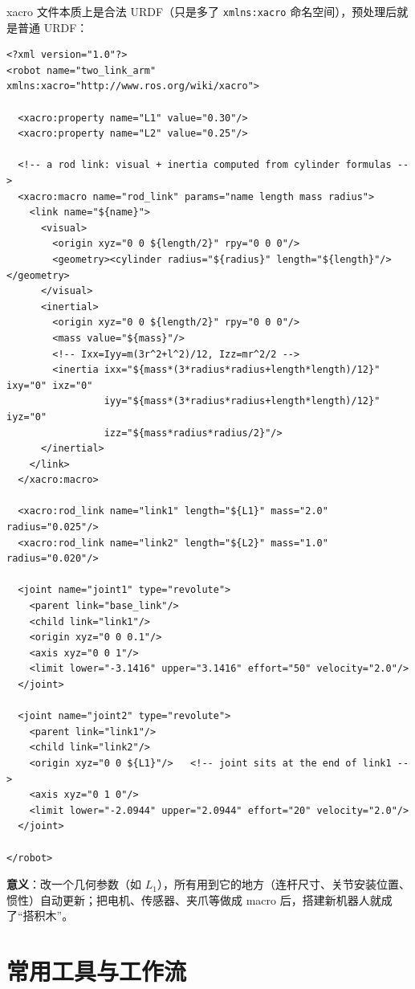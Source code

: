 xacro 文件本质上是合法 URDF（只是多了 \texttt{xmlns:xacro} 命名空间），预处理后就是普通 URDF：

\begin{lstlisting}[style=xml]
<?xml version="1.0"?>
<robot name="two_link_arm" xmlns:xacro="http://www.ros.org/wiki/xacro">

  <xacro:property name="L1" value="0.30"/>
  <xacro:property name="L2" value="0.25"/>

  <!-- a rod link: visual + inertia computed from cylinder formulas -->
  <xacro:macro name="rod_link" params="name length mass radius">
    <link name="${name}">
      <visual>
        <origin xyz="0 0 ${length/2}" rpy="0 0 0"/>
        <geometry><cylinder radius="${radius}" length="${length}"/></geometry>
      </visual>
      <inertial>
        <origin xyz="0 0 ${length/2}" rpy="0 0 0"/>
        <mass value="${mass}"/>
        <!-- Ixx=Iyy=m(3r^2+l^2)/12, Izz=mr^2/2 -->
        <inertia ixx="${mass*(3*radius*radius+length*length)/12}" ixy="0" ixz="0"
                 iyy="${mass*(3*radius*radius+length*length)/12}" iyz="0"
                 izz="${mass*radius*radius/2}"/>
      </inertial>
    </link>
  </xacro:macro>

  <xacro:rod_link name="link1" length="${L1}" mass="2.0" radius="0.025"/>
  <xacro:rod_link name="link2" length="${L2}" mass="1.0" radius="0.020"/>

  <joint name="joint1" type="revolute">
    <parent link="base_link"/>
    <child link="link1"/>
    <origin xyz="0 0 0.1"/>
    <axis xyz="0 0 1"/>
    <limit lower="-3.1416" upper="3.1416" effort="50" velocity="2.0"/>
  </joint>

  <joint name="joint2" type="revolute">
    <parent link="link1"/>
    <child link="link2"/>
    <origin xyz="0 0 ${L1}"/>   <!-- joint sits at the end of link1 -->
    <axis xyz="0 1 0"/>
    <limit lower="-2.0944" upper="2.0944" effort="20" velocity="2.0"/>
  </joint>

</robot>
\end{lstlisting}

\textbf{意义}：改一个几何参数（如 $L_{1}$），所有用到它的地方（连杆尺寸、关节安装位置、惯性）自动更新；把电机、传感器、夹爪等做成 macro 后，搭建新机器人就成了“搭积木”。

\section{常用工具与工作流}

